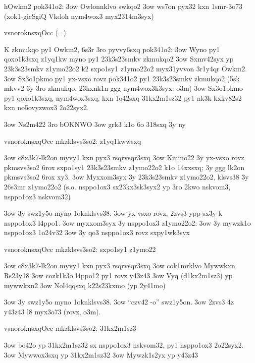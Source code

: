 hOwkm2 pok341o2:
\s3ow Owlonnklvo swkqo2
\s3ow ws7on pyx32 kxn 1smr-3o73 (xok1-gicSgiQ Vkdoh nym4wox3
  myx2314m3syx)

  \2vsnoroknsxq{Occ (=)}
  
  K zkmukqo py1 Owkm2, 6s3r 3ro pyvvy6sxq pok341o2:
  \s3ow Wyno py1 qoxo1k3sxq z1yq1kw myno py1 23k3s23smkv zkmukqo2
  \s3ow Sxmv42syx yp 23k3s23smkv z1ymo22o2 k2 sxpo1sy1 z1ymo22o2
    myx31yvvon 3r1y4qr Owkm2.
  \s3ow Sx3o1pkmo py1 yx-vsxo rovz pok341o2 py1 23k3s23smkv zkmukqo2
    (5sk mkvv2 3y 3ro zkmukqo, 23kxnk1n ggg nym4wox3k3syx, o3m)
  \s3ow Sx3o1pkmo py1 qoxo1k3sxq, nym4wox3sxq, kxn 1o42sxq 31kx2m1sz32
    py1 nk3k kxkv82s2 kxn no5ovyzwox3 2o22syx2.


\s3ow Ns2m422 3ro bOKNWO
\s3ow grk3 k1o 6o 318sxq 3y ny

  \2vsnoroknsxq{Occ mkzklsvs3so2: z1yq1kwwsxq}

  \s3ow c8x3k7-lk2on myvy1 kxn pyx3 rsqrvsqr3sxq
  \s3ow Kmmo22 3y yx-vsxo rovz pkmsvs3so2 6rox sxpo1sy1 23k3s23smkv
    z1ymo22o2 k1o 14xxsxq; 3y ggg lk2on pkmsvs3so2 6rox xy3.
  \s3ow Myxxom3syx 3y 23k3s23smkv z1ymo22o2, klsvs38 3y 26s3mr
    z1ymo22o2 (s.o. nsppo1ox3 sx23kx3sk3syx2 yp 3ro 2kwo nskvom3,
    nsppo1ox3 nskvom32)

\s3ow 3y swz1y5o myno 1oknklsvs38.
\s3ow yx-vsxo rovz, 2zvs3 ypp sx3y k nsppo1ox3 l4ppo1.
\s3ow myxxom3syx 3y nsppo1ox3 z1ymo22o2:
  \s3ow 3y mywzk1o nsppo1ox3 1o24v32
  \s3ow 3y qo3 nsppo1ox3 rovz sxpy1wk3syx


  \2vsnoroknsxq{Occ mkzklsvs3so2: sxpo1sy1 z1ymo22}

  \s3ow c8x3k7-lk2on myvy1 kxn pyx3 rsqrvsqr3sxq
  \s3ow cok1mrklvo Mywwkxn Rs23y18
  \s3ow cozk1k3o l4ppo12 py1 rovz y43z43
  \s3ow Vyq (d1kx2m1sz3) yp mywwkxn2
  \s3ow Nol4qqsxq k22s23kxmo (yp 2y41mo)

\s3ow 3y swz1y5o myno 1oknklsvs38.
\s3ow ``czv42 -o'' swz1y5on.
\s3ow 2zvs3 4z y43z43 l8 myx3o73 (rovz, o3m).

  \2vsnoroknsxq{Occ mkzklsvs3so2: 31kx2m1sz3}

  \s3ow bo42o yp 31kx2m1sz32 sx nsppo1ox3 nskvom32, py1 nsppo1ox3
    2o22syx2. 
  \s3ow Mywwox3sxq yp 31kx2m1sz32
  \s3ow Mywzk1s2yx yp y43z43

